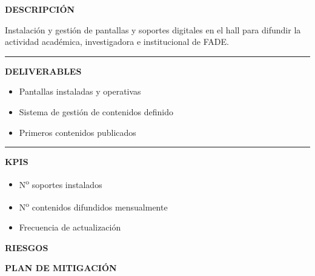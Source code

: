 \documentclass[11pt,a4paper]{scrreprt}
\newcommand{\fieldlabel}[1]{%
  {\footnotesize\sffamily\bfseries\color{mutedcolor}\MakeUppercase{#1}}\par\nopagebreak[4]
}
\newcommand{\fieldsep}{\vspace{3pt}\noindent\textcolor{bordercolor}{\rule{\linewidth}{0.4pt}}\vspace{3pt}\par}
\begin{document}
\begin{tcolorbox}[pabox={espcolor}{PA3.2 \enspace\textbullet\enspace Soportes digitales de comunicación}]

\fieldlabel{Descripci\'on}
{\small Instalación y gestión de pantallas y soportes digitales en el hall para difundir la actividad académica, investigadora e institucional de FADE.}\par
\fieldsep
\fieldlabel{Deliverables}
{\small \begin{itemize}[noitemsep,topsep=2pt]
\item Pantallas instaladas y operativas
\item Sistema de gestión de contenidos definido
\item Primeros contenidos publicados
\end{itemize}}\par
\fieldsep
\fieldlabel{KPIs}
{\small \begin{itemize}[noitemsep,topsep=2pt]
\item N\textsuperscript{o} soportes instalados
\item N\textsuperscript{o} contenidos difundidos mensualmente
\item Frecuencia de actualización
\end{itemize}}\par
\end{tcolorbox}
\begin{tcolorbox}[riskbox]
{\footnotesize\sffamily\bfseries\color{red!50!black} RIESGOS}\par{}
\end{tcolorbox}
\begin{tcolorbox}[mitbox]
{\footnotesize\sffamily\bfseries\color{green!40!black} PLAN DE MITIGACI\'ON}\par{}
\end{tcolorbox}
\vspace{8pt}
\end{document}

